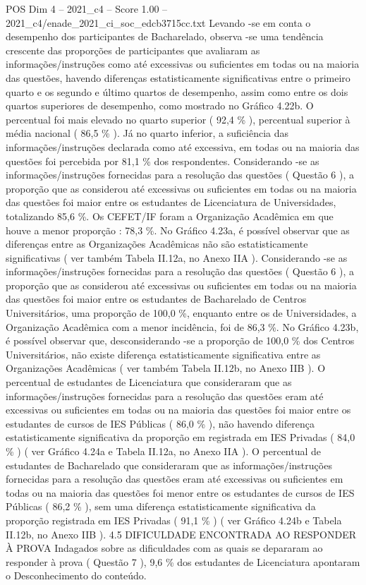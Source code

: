 \begin{textsample}{POS Dim 4 – 2021\_c4 – Score 1.00 – 2021\_c4/enade\_2021\_ci\_soc\_edcb3715cc.txt}
Levando -se em conta o desempenho dos participantes de Bacharelado, observa -se uma tendência crescente das proporções de participantes que avaliaram as informações/instruções como até excessivas ou suficientes em todas ou na maioria das questões, havendo diferenças estatisticamente significativas entre o primeiro quarto e os segundo e último quartos de desempenho, assim como entre os dois quartos superiores de desempenho, como mostrado no Gráfico 4.22b.
O percentual foi mais elevado no quarto superior ( 92,4 \% ), percentual superior à média nacional ( 86,5 \% ).
Já no quarto inferior, a suficiência das informações/instruções declarada como até excessiva, em todas ou na maioria das questões foi percebida por 81,1 \% dos respondentes.
Considerando -se as informações/instruções fornecidas para a resolução das questões ( Questão 6 ), a proporção que as considerou até excessivas ou suficientes em todas ou na maioria das questões foi maior entre os estudantes de Licenciatura de Universidades, totalizando 85,6 \%.
Os CEFET/IF foram a Organização Acadêmica em que houve a menor proporção : 78,3 \%.
No Gráfico 4.23a, é possível observar que as diferenças entre as Organizações Acadêmicas não são estatisticamente significativas ( ver também Tabela II.12a, no Anexo IIA ).
Considerando -se as informações/instruções fornecidas para a resolução das questões ( Questão 6 ), a proporção que as considerou até excessivas ou suficientes em todas ou na maioria das questões foi maior entre os estudantes de Bacharelado de Centros Universitários, uma proporção de 100,0 \%, enquanto entre os de Universidades, a Organização Acadêmica com a menor incidência, foi de 86,3 \%.
No Gráfico 4.23b, é possível observar que, desconsiderando -se a proporção de 100,0 \% dos Centros Universitários, não existe diferença estatisticamente significativa entre as Organizações Acadêmicas ( ver também Tabela II.12b, no Anexo IIB ).
O percentual de estudantes de Licenciatura que consideraram que as informações/instruções fornecidas para a resolução das questões eram até excessivas ou suficientes em todas ou na maioria das questões foi maior entre os estudantes de cursos de IES Públicas ( 86,0 \% ), não havendo diferença estatisticamente significativa da proporção em registrada em IES Privadas ( 84,0 \% ) ( ver Gráfico 4.24a e Tabela II.12a, no Anexo IIA ).
O percentual de estudantes de Bacharelado que consideraram que as informações/instruções fornecidas para a resolução das questões eram até excessivas ou suficientes em todas ou na maioria das questões foi menor entre os estudantes de cursos de IES Públicas ( 86,2 \% ), sem uma diferença estatisticamente significativa da proporção registrada em IES Privadas ( 91,1 \% ) ( ver Gráfico 4.24b e Tabela II.12b, no Anexo IIB ). 4.5 DIFICULDADE ENCONTRADA AO RESPONDER À PROVA Indagados sobre as dificuldades com as quais se depararam ao responder à prova ( Questão 7 ), 9,6 \% dos estudantes de Licenciatura apontaram o Desconhecimento do conteúdo.

\end{textsample}
